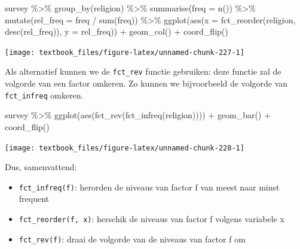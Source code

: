 \documentclass[]{tufte-book}
\newenvironment{Shaded}{}{}
\newcommand{\AttributeTok}[1]{\textcolor[rgb]{0.49,0.56,0.16}{#1}}
\newcommand{\FunctionTok}[1]{\textcolor[rgb]{0.02,0.16,0.49}{#1}}
\newcommand{\NormalTok}[1]{#1}
\newcommand{\SpecialCharTok}[1]{\textcolor[rgb]{0.25,0.44,0.63}{#1}}
\providecommand{\tightlist}{%
  \setlength{\itemsep}{0pt}\setlength{\parskip}{0pt}}
\begin{document}
\begin{Shaded}
\begin{Highlighting}[]
\NormalTok{survey }\SpecialCharTok{\%\textgreater{}\%}
  \FunctionTok{group\_by}\NormalTok{(religion) }\SpecialCharTok{\%\textgreater{}\%}
  \FunctionTok{summarise}\NormalTok{(}\AttributeTok{freq =} \FunctionTok{n}\NormalTok{()) }\SpecialCharTok{\%\textgreater{}\%}
  \FunctionTok{mutate}\NormalTok{(}\AttributeTok{rel\_freq =}\NormalTok{ freq }\SpecialCharTok{/} \FunctionTok{sum}\NormalTok{(freq)) }\SpecialCharTok{\%\textgreater{}\%}
  \FunctionTok{ggplot}\NormalTok{(}\FunctionTok{aes}\NormalTok{(}\AttributeTok{x =} \FunctionTok{fct\_reorder}\NormalTok{(religion, }\FunctionTok{desc}\NormalTok{(rel\_freq)), }\AttributeTok{y =}\NormalTok{ rel\_freq)) }\SpecialCharTok{+}
  \FunctionTok{geom\_col}\NormalTok{() }\SpecialCharTok{+}
  \FunctionTok{coord\_flip}\NormalTok{()}
\end{Highlighting}
\end{Shaded}

\texttt{[image: textbook\_files/figure-latex/unnamed-chunk-227-1]}

Als alternatief kunnen we de \texttt{fct\_rev} functie gebruiken: deze functie zal de volgorde van een factor omkeren. Zo kunnen we bijvoorbeeld de volgorde van \texttt{fct\_infreq} omkeren.

\begin{Shaded}
\begin{Highlighting}[]
\NormalTok{survey }\SpecialCharTok{\%\textgreater{}\%}
  \FunctionTok{ggplot}\NormalTok{(}\FunctionTok{aes}\NormalTok{(}\FunctionTok{fct\_rev}\NormalTok{(}\FunctionTok{fct\_infreq}\NormalTok{(religion)))) }\SpecialCharTok{+}
  \FunctionTok{geom\_bar}\NormalTok{() }\SpecialCharTok{+}
  \FunctionTok{coord\_flip}\NormalTok{()}
\end{Highlighting}
\end{Shaded}

\texttt{[image: textbook\_files/figure-latex/unnamed-chunk-228-1]}

Dus, samenvattend:

\begin{itemize}
\tightlist
\item
  \texttt{fct\_infreq(f)}: herorden de niveaus van factor f van meest naar minst frequent
\item
  \texttt{fct\_reorder(f,\ x)}: herschik de niveaus van factor f volgens variabele x
\item
  \texttt{fct\_rev(f)}: draai de volgorde van de niveaus van factor f om
\end{itemize}
\end{document}
